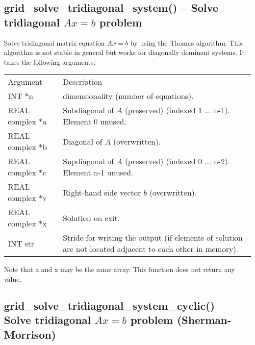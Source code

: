 \documentclass[12pt,letterpaper]{report}
\begin{document}
\subsection{grid\_solve\_tridiagonal\_system() -- Solve tridiagonal $Ax = b$ problem}

Solve tridiagonal matrix equation $Ax = b$ by using the Thomas algorithm. This algorithm is not stable in general but works for diagonally dominant systems. It takes the following arguments:
\begin{longtable}{p{} p{}}
Argument & Description\\
\cline{1-2}
INT *n & dimensionality (number of equations).\\
REAL complex *a & Subdiagonal of $A$ (preserved) (indexed 1 ... n-1). Element 0 unused.\\
REAL complex *b & Diagonal of $A$ (overwritten).\\
REAL complex *c & Supdiagonal of $A$ (preserved) (indexed 0 ... n-2). Element n-1 unused.\\
REAL complex *v & Right-hand side vector $b$ (overwritten).\\
REAL complex *x & Solution on exit.\\
INT str & Stride for writing the output (if elements of solution are not located adjacent to each other in memory).\\
\end{longtable}
\noindent
Note that a and x may be the same array. This function does not return any value.

\subsection{grid\_solve\_tridiagonal\_system\_cyclic() -- Solve tridiagonal $Ax = b$ problem (Sherman-Morrison)}
\end{document}
